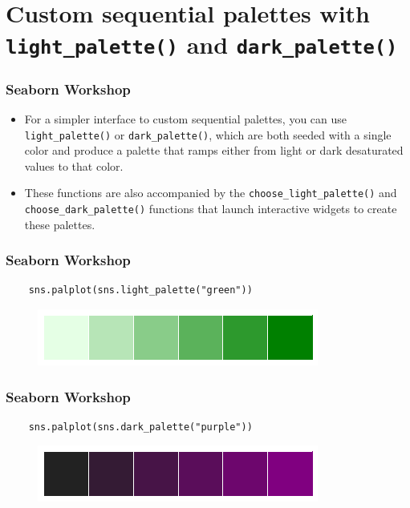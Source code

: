 \documentclass{beamer}
\begin{document}
\section{Custom sequential palettes with \texttt{light\_palette()} and \texttt{dark\_palette()}}
\begin{frame}[fragile]
	\frametitle{Seaborn Workshop}
	\large
	\begin{itemize}
		\item For a simpler interface to custom sequential palettes, you can use \texttt{light\_palette()} or \texttt{dark\_palette()}, which are both seeded with a single color and produce a palette that ramps either from light or dark desaturated values to that color. 
		\item These functions are also accompanied by the \texttt{choose\_light\_palette()} and \texttt{choose\_dark\_palette()} functions that launch interactive widgets to create these palettes.
	\end{itemize}
	
\end{frame}
\begin{frame}[fragile]
	\frametitle{Seaborn Workshop}
	\large
	\begin{verbatim}
	sns.palplot(sns.light_palette("green"))
	\end{verbatim}
	
	\begin{figure}
		\centering
		\includegraphics[width=0.7\linewidth]{images/color_palettes_43_0}
		\caption{}
		\label{fig:color_palettes_43_0}
	\end{figure}
	
\end{frame}
\begin{frame}[fragile]
	\frametitle{Seaborn Workshop}
	\large
	\begin{verbatim}
	sns.palplot(sns.dark_palette("purple"))
	\end{verbatim}	
	
	
	\begin{figure}
		\centering
		\includegraphics[width=0.7\linewidth]{images/color_palettes_44_0}
		\caption{}
		\label{fig:color_palettes_44_0}
	\end{figure}
	
\end{frame}
\end{document}
